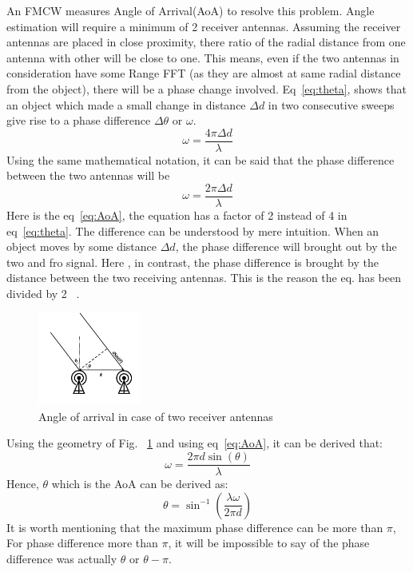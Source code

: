An FMCW measures Angle of Arrival(AoA) to resolve this problem. Angle estimation will require a minimum of 2 receiver antennas. Assuming the receiver antennas are placed in close proximity, there ratio of the radial distance from one antenna with other will be close to one. This means, even if the two antennas in consideration have some Range FFT (as they are almost at same radial distance from the object), there will be a phase change involved. Eq~\eqref{eq:theta}, shows that an object which made a small change in distance $\Delta d$ in two consecutive sweeps give rise to a phase difference $\Delta \theta$ or $\omega$.
\[\omega= \frac{4\pi \Delta d}{\lambda}\]
Using the same mathematical notation, it can be said that the phase difference between the two antennas will be
\begin{equation}\label{eq:AoA}
\omega= \frac{2\pi \Delta d}{\lambda}    
\end{equation}
Here is the eq~\eqref{eq:AoA}, the equation has a factor of 2 instead of 4 in eq~\eqref{eq:theta}. The difference can be understood by mere intuition. When an object moves by some distance $\Delta d$, the phase difference will brought out by the two and fro signal. Here , in contrast, the phase difference is brought by the distance between the two receiving antennas. This is the reason the eq. has been divided by 2 ~\cite{rao_2017}.
 \begin{figure}[ht]
  \begin{center}
    \includegraphics[width=0.3\textwidth]{Master's thesis/images/AoA.PNG} 
    \caption{Angle of arrival in case of two receiver antennas}
    \label{fig:AoA}
  \end{center}
\end{figure}  
Using the geometry of Fig. ~\ref{fig:AoA} and using eq~\eqref{eq:AoA}, it can be derived that:
\[\omega= \frac{2\pi d\sin(\theta)}{\lambda}\]
Hence, $\theta$ which is the AoA can be derived as:
\begin{equation}
    \theta= \sin^{-1}(\frac{\lambda\omega}{2\pi d})
\end{equation}
It is worth mentioning that the maximum phase difference can be more than $\pi$, For phase difference more than $\pi$, it will be impossible to say of the phase difference was actually $\theta$ or $\theta-\pi$.

